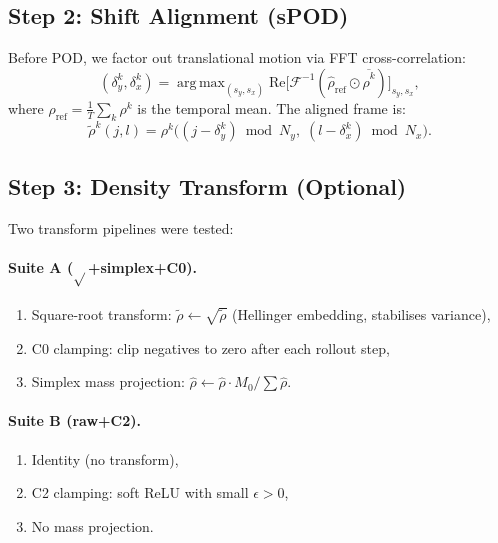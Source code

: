 \documentclass[11pt]{article}
\DeclareMathOperator*{\argmax}{arg\,max}
\begin{document}
\subsection{Step 2: Shift Alignment (sPOD)}

Before POD, we factor out translational motion via FFT cross-correlation:
\begin{equation}
  (\delta_y^k, \delta_x^k)
  = \argmax_{(s_y, s_x)}
  \text{Re}\bigl[\mathcal{F}^{-1}(\hat{\rho}_{\text{ref}} \odot \overline{\hat{\rho}^k})\bigr]_{s_y, s_x},
\end{equation}
where $\rho_{\text{ref}} = \frac{1}{T}\sum_k \rho^k$ is the temporal mean.
The aligned frame is:
\begin{equation}
  \tilde{\rho}^k(j,l) = \rho^k\bigl((j-\delta_y^k) \bmod N_y,\;
  (l - \delta_x^k) \bmod N_x\bigr).
\end{equation}


\subsection{Step 3: Density Transform (Optional)}

Two transform pipelines were tested:

\paragraph{Suite A ($\sqrt{}$+simplex+C0).}
\begin{enumerate}[nosep]
  \item Square-root transform: $\tilde{\rho} \leftarrow \sqrt{\tilde{\rho}}$
    (Hellinger embedding, stabilises variance),
  \item C0 clamping: clip negatives to zero after each rollout step,
  \item Simplex mass projection: $\hat{\rho} \leftarrow \hat{\rho} \cdot M_0 / \sum\hat{\rho}$.
\end{enumerate}

\paragraph{Suite B (raw+C2).}
\begin{enumerate}[nosep]
  \item Identity (no transform),
  \item C2 clamping: soft ReLU with small $\epsilon > 0$,
  \item No mass projection.
\end{enumerate}
\end{document}
